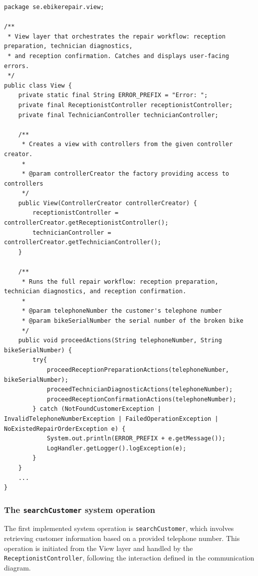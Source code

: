 \documentclass[a4paper]{scrartcl}
\begin{document}
\begin{lstlisting}[style=javastyle, caption={Skeleton code of \texttt{View} class}]
package se.ebikerepair.view;

/**
 * View layer that orchestrates the repair workflow: reception preparation, technician diagnostics,
 * and reception confirmation. Catches and displays user-facing errors.
 */
public class View {
    private static final String ERROR_PREFIX = "Error: ";
    private final ReceptionistController receptionistController;
    private final TechnicianController technicianController;

    /**
     * Creates a view with controllers from the given controller creator.
     *
     * @param controllerCreator the factory providing access to controllers
     */
    public View(ControllerCreator controllerCreator) {
        receptionistController = controllerCreator.getReceptionistController();
        technicianController = controllerCreator.getTechnicianController();
    }

    /**
     * Runs the full repair workflow: reception preparation, technician diagnostics, and reception confirmation.
     *
     * @param telephoneNumber the customer's telephone number
     * @param bikeSerialNumber the serial number of the broken bike
     */
    public void proceedActions(String telephoneNumber, String bikeSerialNumber) {
        try{
            proceedReceptionPreparationActions(telephoneNumber, bikeSerialNumber);
            proceedTechnicianDiagnosticActions(telephoneNumber);
            proceedReceptionConfirmationActions(telephoneNumber);
        } catch (NotFoundCustomerException | InvalidTelephoneNumberException | FailedOperationException | NoExistedRepairOrderException e) {
            System.out.println(ERROR_PREFIX + e.getMessage());
            LogHandler.getLogger().logException(e);
        }
    }
    ...
}
\end{lstlisting}

\subsubsection{The \texttt{searchCustomer} system operation}

The first implemented system operation is \texttt{searchCustomer}, which involves retrieving customer information based on a provided telephone number. This operation is initiated from the View layer and handled by the \texttt{ReceptionistController}, following the interaction defined in the communication diagram.
\end{document}

